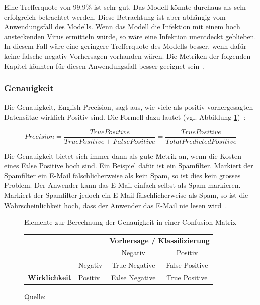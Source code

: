 Eine Trefferquote von 99.9\% ist sehr gut. Das Modell könnte durchaus als sehr erfolgreich betrachtet werden. Diese Betrachtung ist aber abhängig vom Anwendungsfall des Modells. Wenn das Modell die Infektion mit einem hoch ansteckenden Virus ermitteln würde, so wäre eine Infektion unentdeckt geblieben. In diesem Fall wäre eine geringere Trefferquote des Modells besser, wenn dafür keine falsche negativ Vorhersagen vorhanden wären. Die Metriken der folgenden Kapitel könnten für diesen Anwendungsfall besser geeignet sein~\autocite{TDSAccuracy}.

\subsubsection{Genauigkeit}

Die Genauigkeit, English Precision, sagt aus, wie viele als positiv vorhergesagten Datensätze wirklich Positiv sind. Die Formell dazu lautet (vgl. Abbildung \ref{cm-precision})~\autocite{TDSAccuracy}: 

$$Precision = \frac{True Positive}{True Positive + False Positive} = \frac{True Positive}{Total Predicted Positive}$$

Die Genauigkeit bietet sich immer dann als gute Metrik an, wenn die Kosten eines False Positive hoch sind. Ein Beispiel dafür ist ein Spamfilter. Markiert der Spamfilter ein E-Mail fälschlicherweise als kein Spam, so ist dies kein grosses Problem. Der Anwender kann das E-Mail einfach selbst als Spam markieren. Markiert der Spamfilter jedoch ein E-Mail fälschlicherweise als Spam, so ist die Wahrscheinlichkeit hoch, dass der Anwender das E-Mail nie lesen wird~\autocite{TDSAccuracy}.

\begin{figure}[h!]
    \centering
    \captionsetup{width=.9\linewidth}
    \caption{Elemente zur Berechnung der Genauigkeit in einer Confusion Matrix}
    \label{cm-precision}
    \def\arraystretch{1.5}
    \begin{tabular}{llcc}
        \multicolumn{2}{l}{}                                                                        & \multicolumn{2}{c}{\textbf{Vorhersage / Klassifizierung}}                                         \\ \cline{3-4} 
        \multicolumn{1}{c}{\textbf{}}                                & \multicolumn{1}{l|}{}        & \multicolumn{1}{c|}{Negativ}        & \multicolumn{1}{c|}{\cellcolor[HTML]{B5D0EE}Positiv}        \\ \cline{2-4} 
        \multicolumn{1}{l|}{}                                        & \multicolumn{1}{l|}{Negativ} & \multicolumn{1}{c|}{True Negative}  & \multicolumn{1}{c|}{\cellcolor[HTML]{B5D0EE}False Positive} \\ \cline{2-4} 
        \multicolumn{1}{l|}{\multirow{-2}{*}{\textbf{Wirklichkeit}}} & \multicolumn{1}{l|}{Positiv} & \multicolumn{1}{c|}{False Negative} & \multicolumn{1}{c|}{\cellcolor[HTML]{B5D0EE}True Positive}  \\ \cline{2-4} 
    \end{tabular}
    \caption*{Quelle: \textcite{TDSAccuracy}}
\end{figure}

